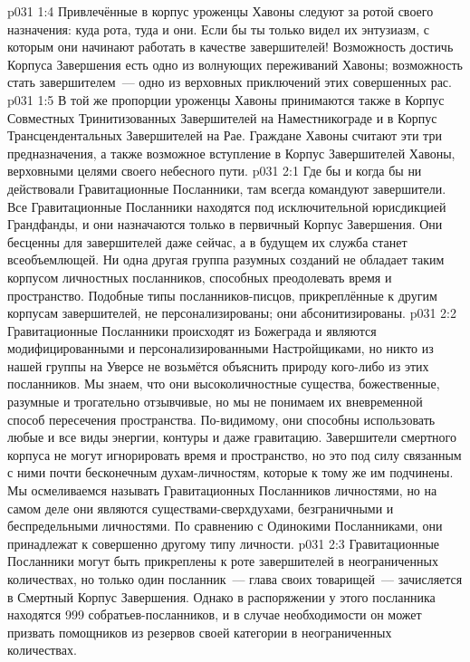 \vs p031 1:4 Привлечённые в корпус уроженцы Хавоны следуют за ротой своего назначения: куда рота, туда и они. Если бы ты только видел их энтузиазм, с которым они начинают работать в качестве завершителей! Возможность достичь Корпуса Завершения есть одно из волнующих переживаний Хавоны; возможность стать завершителем~--- одно из верховных приключений этих совершенных рас.
\vs p031 1:5 В той же пропорции уроженцы Хавоны принимаются также в Корпус Совместных Тринитизованных Завершителей на Наместникограде и в Корпус Трансцендентальных Завершителей на Рае. Граждане Хавоны считают эти три предназначения, а также возможное вступление в Корпус Завершителей Хавоны, верховными целями своего небесного пути.
\vs p031 2:1 Где бы и когда бы ни действовали Гравитационные Посланники, там всегда командуют завершители. Все Гравитационные Посланники находятся под исключительной юрисдикцией Грандфанды, и они назначаются только в первичный Корпус Завершения. Они бесценны для завершителей даже сейчас, а в будущем их служба станет всеобъемлющей. Ни одна другая группа разумных созданий не обладает таким корпусом личностных посланников, способных преодолевать время и пространство. Подобные типы посланников\hyp{}писцов, прикреплённые к другим корпусам завершителей, не персонализированы; они абсонитизированы.
\vs p031 2:2 \pc Гравитационные Посланники происходят из Божеграда и являются модифицированными и персонализированными Настройщиками, но никто из нашей группы на Уверсе не возьмётся объяснить природу кого\hyp{}либо из этих посланников. Мы знаем, что они высоколичностные существа, божественные, разумные и трогательно отзывчивые, но мы не понимаем их вневременной способ пересечения пространства. По\hyp{}видимому, они способны использовать любые и все виды энергии, контуры и даже гравитацию. Завершители смертного корпуса не могут игнорировать время и пространство, но это под силу связанным с ними почти бесконечным духам\hyp{}личностям, которые к тому же им подчинены. Мы осмеливаемся называть Гравитационных Посланников личностями, но на самом деле они являются существами\hyp{}сверхдухами, безграничными и беспредельными личностями. По сравнению с Одинокими Посланниками, они принадлежат к совершенно другому типу личности.
\vs p031 2:3 \pc Гравитационные Посланники могут быть прикреплены к роте завершителей в неограниченных количествах, но только один посланник~--- глава своих товарищей~--- зачисляется в Смертный Корпус Завершения. Однако в распоряжении у этого посланника находятся 999 собратьев\hyp{}посланников, и в случае необходимости он может призвать помощников из резервов своей категории в неограниченных количествах.
